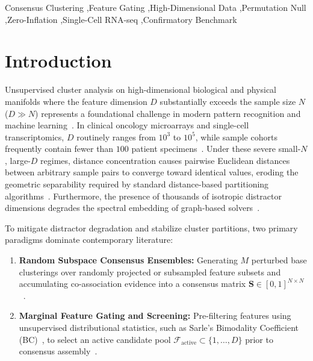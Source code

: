 \documentclass[preprint,12pt]{elsarticle}
\begin{document}
\begin{frontmatter}
\begin{abstract}
convergence bounds ($\mathcal{O}(L^{-1/2})$) and exponential noise suppression. \textsc{AutoNullConsensus} provides 1-line integration with the standard Python single-cell ecosystem (\texttt{Scanpy}/\texttt{AnnData}) and executes on $1{,}000{,}000$ cells in sub-three seconds via GPU acceleration.
\end{abstract}

\begin{keyword}
Consensus Clustering \sep Feature Gating \sep High-Dimensional Data \sep Permutation Null \sep Zero-Inflation \sep Single-Cell RNA-seq \sep Confirmatory Benchmark
\end{keyword}

\end{frontmatter}

\section{Introduction}\label{sec:intro}

Unsupervised cluster analysis on high-dimensional biological and physical manifolds where the feature dimension $D$ substantially exceeds the sample size $N$ ($D \gg N$) represents a foundational challenge in modern pattern recognition and machine learning~\cite{peng2024interpreting,desouto2008clustering,zheng2017massively}. In clinical oncology microarrays and single-cell transcriptomics, $D$ routinely ranges from $10^3$ to $10^5$, while sample cohorts frequently contain fewer than $100$ patient specimens~\cite{desouto2008clustering,zhou2024comprehensive,wani2024comprehensive}. Under these severe small-$N$, large-$D$ regimes, distance concentration causes pairwise Euclidean distances between arbitrary sample pairs to converge toward identical values, eroding the geometric separability required by standard distance-based partitioning algorithms~\cite{peng2024interpreting,witten2010framework,belucci2025cohirf}. Furthermore, the presence of thousands of isotropic distractor dimensions degrades the spectral embedding of graph-based solvers~\cite{nie2024fast,zhang2025structured,tkde2026fast,wang2024structured,xu2024enhancing}.

To mitigate distractor degradation and stabilize cluster partitions, two primary paradigms dominate contemporary literature:
\begin{enumerate}
    \item \textbf{Random Subspace Consensus Ensembles:} Generating $M$ perturbed base clusterings over randomly projected or subsampled feature subsets and accumulating co-association evidence into a consensus matrix $\mathbf{S} \in [0, 1]^{N \times N}$~\cite{monti2003consensus,fred2005combining,fern2003random,belucci2025cohirf,xu2026dynamic}.
    \item \textbf{Marginal Feature Gating and Screening:} Pre-filtering features using unsupervised distributional statistics, such as Sarle's Bimodality Coefficient (BC)~\cite{sarle1983sas}, to select an active candidate pool $\mathcal{F}_{\text{active}} \subset \{1, \dots, D\}$ prior to consensus assembly~\cite{li2019clustering,patcog2026consensus}.
\end{enumerate}
\end{document}
